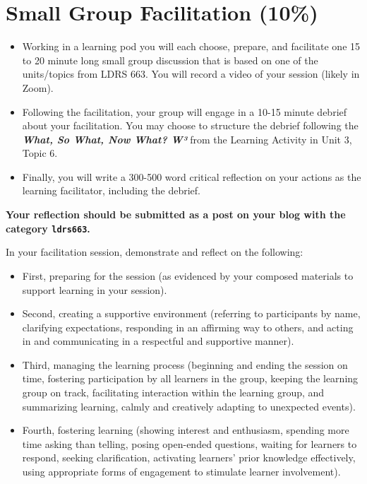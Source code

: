 \documentclass[
]{book}
\providecommand{\tightlist}{%
  \setlength{\itemsep}{0pt}\setlength{\parskip}{0pt}}
\begin{document}
\hypertarget{small-group-facilitation-10}{%
\section*{Small Group Facilitation (10\%)}\label{small-group-facilitation-10}}

\begin{itemize}
\tightlist
\item
  Working in a learning pod you will each choose, prepare, and facilitate one 15 to 20 minute long small group discussion that is based on one of the units/topics from LDRS 663. You will record a video of your session (likely in Zoom).\\
\item
  Following the facilitation, your group will engage in a 10-15 minute debrief about your facilitation. You may choose to structure the debrief following the \textbf{\emph{What, So What, Now What? W³}} from the Learning Activity in Unit 3, Topic 6.\\
\item
  Finally, you will write a 300-500 word critical reflection on your actions as the learning facilitator, including the debrief.
\end{itemize}

\textbf{Your reflection should be submitted as a post on your blog with the category \texttt{ldrs663}.}

In your facilitation session, demonstrate and reflect on the following:

\begin{itemize}
\tightlist
\item
  First, preparing for the session (as evidenced by your composed materials to support learning in your session).\\
\item
  Second, creating a supportive environment (referring to participants by name, clarifying expectations, responding in an affirming way to others, and acting in and communicating in a respectful and supportive manner).\\
\item
  Third, managing the learning process (beginning and ending the session on time, fostering participation by all learners in the group, keeping the learning group on track, facilitating interaction within the learning group, and summarizing learning, calmly and creatively adapting to unexpected events).\\
\item
  Fourth, fostering learning (showing interest and enthusiasm, spending more time asking than telling, posing open-ended questions, waiting for learners to respond, seeking clarification, activating learners' prior knowledge effectively, using appropriate forms of engagement to stimulate learner involvement).
\end{itemize}
\end{document}
